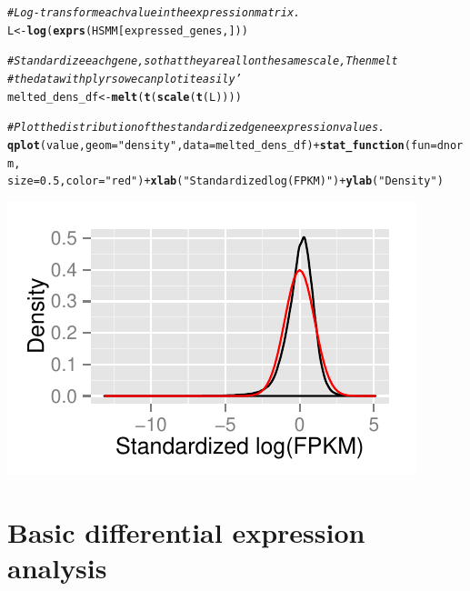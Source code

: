 \documentclass[10pt,oneside]{article}\usepackage[]{graphicx}\usepackage[]{color}
\makeatletter
\def\maxwidth{ %
  \ifdim\Gin@nat@width>\linewidth
    \linewidth
  \else
    \Gin@nat@width
  \fi
}
\newcommand{\hlnum}[1]{\textcolor[rgb]{0.686,0.059,0.569}{#1}}%
\newcommand{\hlstr}[1]{\textcolor[rgb]{0.192,0.494,0.8}{#1}}%
\newcommand{\hlcom}[1]{\textcolor[rgb]{0.678,0.584,0.686}{\textit{#1}}}%
\newcommand{\hlopt}[1]{\textcolor[rgb]{0,0,0}{#1}}%
\newcommand{\hlstd}[1]{\textcolor[rgb]{0.345,0.345,0.345}{#1}}%
\newcommand{\hlkwb}[1]{\textcolor[rgb]{0.69,0.353,0.396}{#1}}%
\newcommand{\hlkwc}[1]{\textcolor[rgb]{0.333,0.667,0.333}{#1}}%
\newcommand{\hlkwd}[1]{\textcolor[rgb]{0.737,0.353,0.396}{\textbf{#1}}}%
\newenvironment{kframe}{%
 \def\at@end@of@kframe{}%
 \ifinner\ifhmode%
  \def\at@end@of@kframe{\end{minipage}}%
  \begin{minipage}{\columnwidth}%
 \fi\fi%
 \def\FrameCommand##1{\hskip\@totalleftmargin \hskip-\fboxsep
 \colorbox{shadecolor}{##1}\hskip-\fboxsep
     \hskip-\linewidth \hskip-\@totalleftmargin \hskip\columnwidth}%
 \MakeFramed {\advance\hsize-\width
   \@totalleftmargin\z@ \linewidth\hsize
   \@setminipage}}%
 {\par\unskip\endMakeFramed%
 \at@end@of@kframe}
\newenvironment{knitrout}{}{} %
\makeatother
\begin{document}
\begin{knitrout}
\color{fgcolor}\begin{kframe}
\begin{alltt}
\hlcom{# Log-transform each value in the expression matrix.}
\hlstd{L} \hlkwb{<-} \hlkwd{log}\hlstd{(}\hlkwd{exprs}\hlstd{(HSMM[expressed_genes, ]))}

\hlcom{# Standardize each gene, so that they are all on the same scale, Then melt}
\hlcom{# the data with plyr so we can plot it easily'}
\hlstd{melted_dens_df} \hlkwb{<-} \hlkwd{melt}\hlstd{(}\hlkwd{t}\hlstd{(}\hlkwd{scale}\hlstd{(}\hlkwd{t}\hlstd{(L))))}

\hlcom{# Plot the distribution of the standardized gene expression values.}
\hlkwd{qplot}\hlstd{(value,} \hlkwc{geom} \hlstd{=} \hlstr{"density"}\hlstd{,} \hlkwc{data} \hlstd{= melted_dens_df)} \hlopt{+} \hlkwd{stat_function}\hlstd{(}\hlkwc{fun} \hlstd{= dnorm,}
    \hlkwc{size} \hlstd{=} \hlnum{0.5}\hlstd{,} \hlkwc{color} \hlstd{=} \hlstr{"red"}\hlstd{)} \hlopt{+} \hlkwd{xlab}\hlstd{(}\hlstr{"Standardized log(FPKM)"}\hlstd{)} \hlopt{+} \hlkwd{ylab}\hlstd{(}\hlstr{"Density"}\hlstd{)}
\end{alltt}
\end{kframe}

{\centering \includegraphics[width=\maxwidth]{figure/lognormal_plot} 

}



\end{knitrout}


\section{Basic differential expression analysis}
\end{document}

